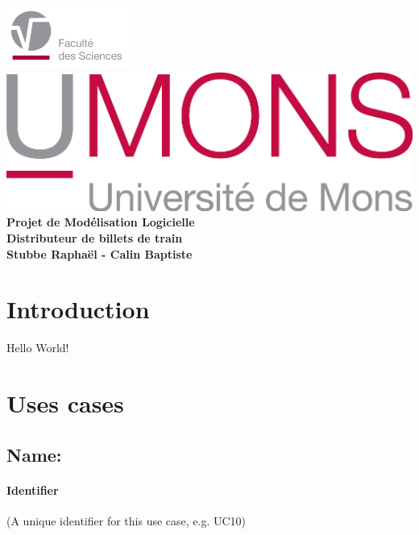 \documentclass{report}
\begin{document}
\begin{titlepage}
    \includegraphics[width=4cm]{fslogo.jpg} %
    \centering
    \vfill
    \includegraphics{UMONS} %
    \vfill
    {\bfseries\Large
        Projet	de	Mod\'elisation	Logicielle\\
        Distributeur de	billets	de train \\
        \vskip2cm
        Stubbe Rapha\"el - Calin Baptiste\\
    }
    \vfill

    \vfill
    \vfill
\end{titlepage}

\newpage

\tableofcontents

\newpage


\section{Introduction}
  Hello World!

  \newpage
\section{Uses cases}
\subsection{Name:}


  \paragraph{Identifier}

  (A unique identifier for this use case, e.g. UC10)
\end{document}
